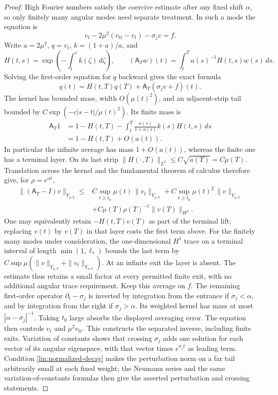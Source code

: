 \begin{proof}
High Fourier numbers satisfy the coercive estimate after any fixed
shift $\alpha$, so only finitely many angular modes need separate
treatment.  In such a mode the equation is
\[
 v_t-2\mu^2(v_{tt}-v_t)-\sigma_jv=f.
\]
Write $a=2\mu^2$, $q=v_t$, $k=(1+a)/a$, and
\[
 H(t,s)=\exp\!\left(-\int_t^s k(\zeta)\,d\zeta\right),\qquad
 (\mathsf A_T w)(t)=\int_t^T a(s)^{-1}H(t,s)w(s)\,ds.
\]
Solving the first-order equation for $q$ backward gives the exact formula
\[
 q(t)=H(t,T)q(T)+\mathsf A_T(\sigma_jv+f)(t).
\]
The kernel has bounded mass, width $O(\mu(t)^2)$, and an adjacent-strip
tail bounded by $C\exp(-c|s-t|/\mu(t)^2)$.  Its finite mass is
\begin{align*}
 \mathsf A_T1
 &=1-H(t,T)-\int_t^T\frac{a(s)}{1+a(s)}k(s)H(t,s)\,ds\\
 &=1-H(t,T)+O(a(t)).
\end{align*}
In particular the infinite average has mass $1+O(a(t))$, whereas the
finite one has a terminal layer.  On its last strip
$\|H(\cdot,T)\|_{L^2}\le C\sqrt{a(T)}=C\mu(T)$.
Translation across the kernel and the fundamental theorem of calculus
therefore give, for $\rho=e^{\alpha t}$,
\begin{equation}\label{lin:fast-average}
 \begin{split}
 \|(\mathsf A_T-I)v\|_{Y_{\rho,h}}
 \le{}&C\sup_{t\ge t_0}\mu(t)\,\|v_t\|_{Y_{\rho,h}}
       +C\sup_{t\ge t_0}\mu(t)^2\,\|v\|_{Y_{\rho,h}}\\
 &+C\mu(T)\rho(T)^{-1}\|v(T)\|_{H^h}.
 \end{split}
\end{equation}
One may equivalently retain $-H(t,T)v(T)$ as part of the terminal lift;
replacing $v(t)$ by $v(T)$ in that layer costs the first term above.
For the finitely many modes under consideration, the one-dimensional
$H^1$ trace on a terminal interval of length $\min(1,\ell_*)$ bounds
the last term by
$C\sup\mu(\|v\|_{Y_{\rho,h}}+\|v_t\|_{Y_{\rho,h}})$.
At an infinite exit the layer is absent.  The estimate thus retains a
small factor at every permitted finite exit, with no additional angular
trace requirement.
Keep this average on $f$.  The remaining first-order operator
$\partial_t-\sigma_j$ is inverted by integration from the entrance
if $\sigma_j<\alpha$, and by integration from the right if
$\sigma_j>\alpha$.  Its weighted kernel has mass at most
$|\alpha-\sigma_j|^{-1}$.  Taking $t_0$ large absorbs the displayed
averaging error.  The equation then controls $v_t$ and $\mu^2v_{tt}$.
This constructs the separated inverse, including finite exits.
Variation of constants shows that crossing $\sigma_j$ adds one solution
for each vector of its angular eigenspace, with that vector times
$e^{\sigma_jt}$ as leading term.  Condition
\eqref{lin:normalized-decay} makes the perturbation norm on a far tail
arbitrarily small at each fixed weight; the Neumann series and the same
variation-of-constants formulas then give the asserted perturbation
and crossing statements.


\end{proof}
